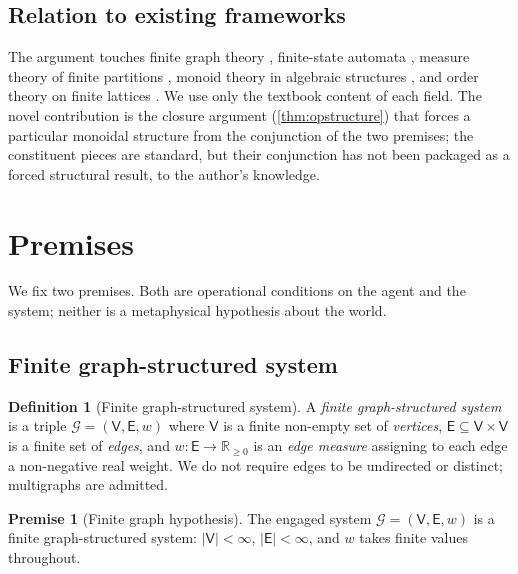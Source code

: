 \documentclass[11pt,a4paper]{article}
\theoremstyle{thmstyle}
\theoremstyle{definition}
\newtheorem{definition}[theorem]{Definition}
\newtheorem{axiom}{Premise}
\theoremstyle{remark}
\newcommand{\R}{\mathbb{R}}
\newcommand{\Graph}{\mathcal{G}}
\newcommand{\Vrt}{\mathsf{V}}
\newcommand{\Edg}{\mathsf{E}}
\begin{document}
\subsection{Relation to existing frameworks}

The argument touches finite graph theory \citep{diestel2017,
bollobas1998}, finite-state automata \citep{hopcroft2007}, measure
theory of finite partitions \citep{halmos1950}, monoid theory in
algebraic structures \citep{howie1995}, and order theory on finite
lattices \citep{daveypriestley2002}. We use only the textbook
content of each field. The novel contribution is the closure
argument (\cref{thm:opstructure}) that forces a particular monoidal
structure from the conjunction of the two premises; the constituent
pieces are standard, but their conjunction has not been packaged as
a forced structural result, to the author's knowledge.

\section{Premises}
\label{sec:premises}

We fix two premises. Both are operational conditions on the agent
and the system; neither is a metaphysical hypothesis about the
world.

\subsection{Finite graph-structured system}

\begin{definition}[Finite graph-structured system]
\label{def:graph}
A \emph{finite graph-structured system} is a triple $\Graph =
(\Vrt, \Edg, w)$ where $\Vrt$ is a finite non-empty set of
\emph{vertices}, $\Edg \subseteq \Vrt \times \Vrt$ is a finite set
of \emph{edges}, and $w: \Edg \to \R_{\geq 0}$ is an \emph{edge
measure} assigning to each edge a non-negative real weight. We do
not require edges to be undirected or distinct; multigraphs are
admitted.
\end{definition}

\begin{axiom}[Finite graph hypothesis]
\label{ax:graph}
The engaged system $\Graph = (\Vrt, \Edg, w)$ is a finite
graph-structured system: $|\Vrt| < \infty$, $|\Edg| < \infty$, and
$w$ takes finite values throughout.
\end{axiom}
\end{document}
